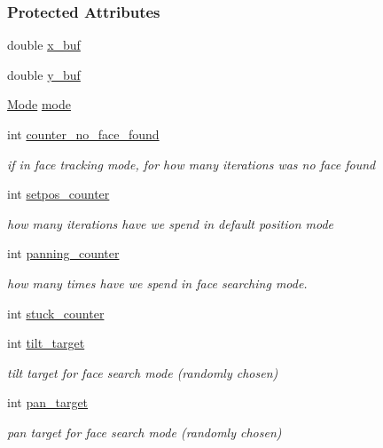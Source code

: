 \subsubsection*{Protected Attributes}
\begin{DoxyCompactItemize}
\item 
double \hyperlink{group__faceTracker_aff8eb6779301cc7c3bacbe3e3759a8ec}{x\+\_\+buf}
\item 
double \hyperlink{group__faceTracker_a1118d9567f870e66e7a3f8e8a966c665}{y\+\_\+buf}
\item 
\hyperlink{group__faceTracker_ac6632cfbb140765f8c5cc507e82b3ec7}{Mode} \hyperlink{group__faceTracker_a6be4817ecaa63045e44b32b66940807f}{mode}
\item 
int \hyperlink{group__faceTracker_a7f20228f4afe88b6712f77e25b2ce30d}{counter\+\_\+no\+\_\+face\+\_\+found}
\begin{DoxyCompactList}\small\item\em if in face tracking mode, for how many iterations was no face found \end{DoxyCompactList}\item 
int \hyperlink{group__faceTracker_af571d0f0d12556b700e396d0e3349838}{setpos\+\_\+counter}
\begin{DoxyCompactList}\small\item\em how many iterations have we spend in default position mode \end{DoxyCompactList}\item 
int \hyperlink{group__faceTracker_a179f88dc8e3e0db4e7a48cae4ad0cab0}{panning\+\_\+counter}
\begin{DoxyCompactList}\small\item\em how many times have we spend in face searching mode. \end{DoxyCompactList}\item 
int \hyperlink{group__faceTracker_a91894c7458dbcc569a7a5504fff41d63}{stuck\+\_\+counter}
\item 
int \hyperlink{group__faceTracker_a3b85f3e3df850b4d5a35df4d0791b612}{tilt\+\_\+target}
\begin{DoxyCompactList}\small\item\em tilt target for face search mode (randomly chosen) \end{DoxyCompactList}\item 
int \hyperlink{group__faceTracker_a07adeda5fcea9369eef00883acc339ea}{pan\+\_\+target}
\begin{DoxyCompactList}\small\item\em pan target for face search mode (randomly chosen) \end{DoxyCompactList}\item 

\end{DoxyCompactItemize}
